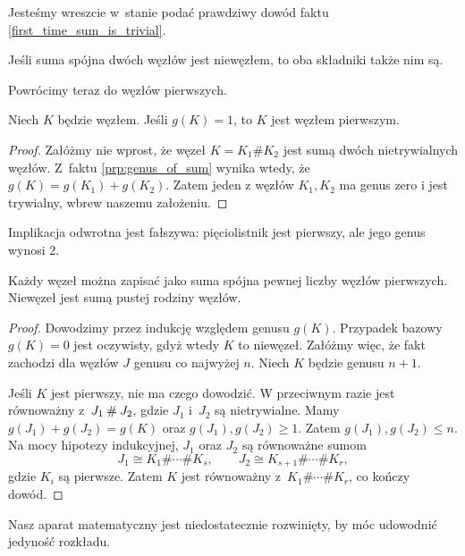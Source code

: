 Jesteśmy wreszcie w~stanie podać prawdziwy dowód faktu \ref{first_time_sum_is_trivial}.

\begin{corollary}
    \label{cor:connected_sum_no_inverses}
    Jeśli suma spójna dwóch węzłów jest niewęzłem, to oba składniki także nim są.
\end{corollary}

Powrócimy teraz do węzłów pierwszych.
%

\begin{proposition}
    Niech $K$ będzie węzłem.
    Jeśli $g(K) = 1$, to $K$ jest węzłem pierwszym.
\end{proposition}

\begin{proof}
    Załóżmy nie wprost, że węzeł $K = K_1 \# K_2$ jest sumą dwóch nietrywialnych węzłów.
    Z~faktu \ref{prp:genus_of_sum} wynika wtedy, że $g(K) = g(K_1) + g(K_2)$.
    Zatem jeden z węzłów $K_1, K_2$ ma genus zero i jest trywialny, wbrew naszemu założeniu.
\end{proof}

Implikacja odwrotna jest fałszywa: pięciolistnik jest pierwszy, ale jego genus wynosi $2$.

\begin{proposition}
    Każdy węzeł można zapisać jako suma spójna pewnej liczby węzłów pierwszych.
    Niewęzeł jest sumą pustej rodziny węzłów.
\end{proposition}

\begin{proof}
    Dowodzimy przez indukcję względem genusu $g(K)$.
    Przypadek bazowy $g(K) = 0$ jest oczywisty, gdyż wtedy $K$ to niewęzeł.
    Załóżmy więc, że fakt zachodzi dla węzłów $J$ genusu co najwyżej $n$.
    Niech $K$ będzie genusu $n + 1$.

    Jeśli $K$ jest pierwszy, nie ma czego dowodzić.
    W przeciwnym razie jest równoważny z~$J_1 \mathbin{\#} J_2$, gdzie $J_1$ i~$J_2$ są nietrywialne.
    Mamy $g(J_1) + g(J_2) = g(K)$ oraz $g(J_1),g(J_2) \ge 1$.
    Zatem $g(J_1), g(J_2) \le n$.
    Na mocy hipotezy indukcyjnej, $J_1$ oraz $J_2$ są równoważne sumom
    \[
        J_1 \cong K_1\#\cdots\# K_s,\qquad
        J_2 \cong K_{s+1}\#\cdots\# K_r,
    \]
    gdzie $K_i$ są pierwsze.
    Zatem $K$ jest równoważny z~$K_1\#\cdots\# K_r$, co kończy dowód.
\end{proof}

Nasz aparat matematyczny jest niedostatecznie rozwinięty, by móc udowodnić jedyność rozkładu.

